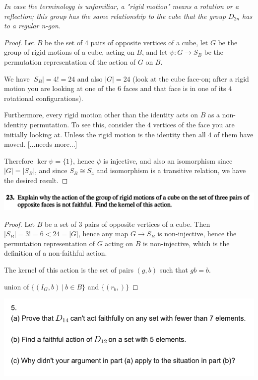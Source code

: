 {\it In case the terminology is unfamiliar, a "rigid motion" means a rotation or a reflection;
this group has the same relationship to the cube that the group $D_{2n}$ has to a regular n-gon.}

\begin{proof}
  Let $B$ be the set of $4$ pairs of opposite vertices of a cube, let $G$ be the group of rigid
  motions of a cube, acting on $B$, and let $\psi: G \to S_B$ be the permutation representation of the
  action of $G$ on $B$.

  We have $|S_B| = 4! = 24$ and also $|G| = 24$ (look at the cube face-on; after a rigid motion you
  are looking at one of the $6$ faces and that face is in one of its $4$ rotational
  configurations).

  Furthermore, every rigid motion other than the identity acts on $B$ as a non-identity
  permutation. To see this, consider the $4$ vertices of the face you are initially looking at.
  Unless the rigid motion is the identity then all $4$ of them have moved. [...needs more...]

  Therefore $\ker \psi = \{1\}$, hence $\psi$ is injective, and also an isomorphism since
  $|G| = |S_B|$, and since $S_B \cong S_4$ and isomorphism is a transitive relation, we have the
  desired result.
\end{proof}



\begin{mdframed}
\includegraphics[width=400pt]{img/abstract-algebra--nf--4-5a92.png}
\end{mdframed}

\begin{proof}
  Let $B$ be a set of $3$ pairs of opposite vertices of a cube. Then $|S_B| = 3! = 6 < 24 = |G|$,
  hence any map $G \to S_B$ is non-injective, hence the permutation representation of $G$ acting
  on $B$ is non-injective, which is the definition of a non-faithful action.

  The kernel of this action is the set of pairs $(g, b)$ such that $gb = b$.

 union of $\{(I_G, b) ~|~ b \in B\}$ and $\{(r_b, )\}$
\end{proof}


\begin{mdframed}
\includegraphics[width=400pt]{img/abstract-algebra--nf--4-1b73.png}
\end{mdframed}


